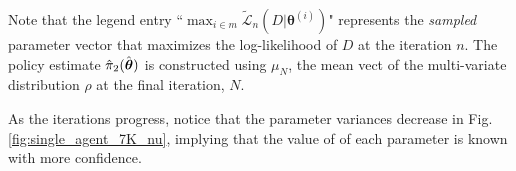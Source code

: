     Note that the legend entry ``$\max_{i \in m}\tilde{\mathcal{L}}_n(D|\mathbf{\theta}^{(i)})$" represents the \emph{sampled} parameter vector that maximizes the log-likelihood of $D$ at the iteration $n$. The policy estimate $\hat{\pi}_2(\hat{\boldsymbol{\mathbb{\theta}}})$ is constructed using $\mu_N$, the mean vect of the multi-variate distribution $\rho$ at the final iteration, $N$.
    
    As the iterations progress, notice that the parameter variances decrease in Fig. \ref{fig:single_agent_7K_nu}, implying that the value of of each parameter is known with more confidence.

    \begin{figure}[H]
        \begin{center}
        \end{center}
    \end{figure}

    \begin{figure}[H]
        \begin{center}
        \end{center}
    \end{figure}


 	\begin{figure}[H]
		\begin{center}
		\end{center}
	\end{figure}

